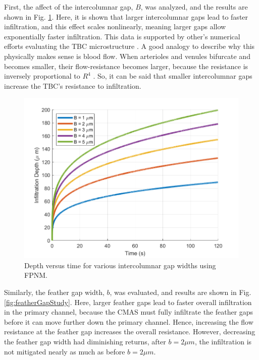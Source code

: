 \documentclass[%
 aip,
 amsmath,amssymb,
 reprint,%
]{revtex4-1}
\begin{document}
First, the affect of the intercolumnar gap, $B$, was analyzed, and the results are shown in Fig. \ref{fig:columnGapStudy}. 
Here, it is shown that larger intercolumnar gaps lead to faster infiltration, and this effect scales nonlinearly, meaning larger gaps allow exponentially faster infiltration. 
This data is supported by other's numerical efforts evaluating the TBC microstructure \cite{Sirigiri2018}.
A good analogy to describe why this physically makes sense is blood flow. When arterioles and venules bifurcate and becomes smaller, their flow-resistance becomes larger, because the resistance is inversely proportional to $R^{4}$ \cite{Chandran2012}. So, it can be said that smaller intercolumnar gaps increase the TBC's resistance to infiltration.

\begin{figure}[htp!]
    \centering
    \includegraphics[width=\linewidth]{Figures/intercolumnarGapStudy.png}
    \caption{Depth versus time for various intercolumnar gap widths using FPNM.}
    \label{fig:columnGapStudy}
\end{figure}

Similarly, the feather gap width, $b$, was evaluated, and results are shown in Fig. \ref{fig:featherGapStudy}. 
Here, larger feather gaps lead to faster overall infiltration in the primary channel, because the CMAS must fully infiltrate the feather gaps before it can move further down the primary channel. Hence, increasing the flow resistance at the feather gap increases the overall resistance. 
However, decreasing the feather gap width had diminishing returns, after $b = 2 \mu m$, the infiltration is not mitigated nearly as much as before $b=2 \mu m$.
\end{document}
